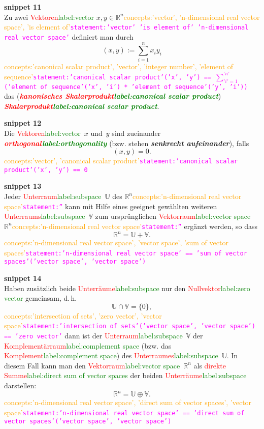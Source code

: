 \documentclass[a4paper,twoside,english,ngerman,deutsch,german,sectrefs,envcountsame,envcountchap]{svmono}
\newcommand{\setref}[2]{\textcolor{red}{#1}\textcolor{green}{#2}}
\newcommand{\snippet}[1]{\textbf{snippet #1}\\}
\newcommand{\eqnote}[2]{\textcolor{orange}{#1}\textcolor{magenta}{\texttt{#2}}}
\begin{document}
\snippet{11}
Zu zwei \setref{Vektoren}{label:vector} $x,y\in{\mathbb{R}}^{n}$\eqnote{concepts:'vector', 'n-dimensional real vector space', 'is element of'}{statement:'vector' 'is element of' 'n-dimensional real vector space'} definiert man durch
\begin{equation}
(x,y):=\sum_{i=1}^{n}x_{i}y_{i}\label{eq:skalarprodukt}
\end{equation}
\eqnote{concepts:'canonical scalar product', 'vector', 'integer number', 'element of sequence'}{statement:'canonical scalar product'('x', 'y') == $\sum_{'i'=1}^{'n'}$ ('element of sequence'('x', 'i') * 'element of sequence'('y', 'i'))}
das (\textbf{\em \setref{kanonisches Skalarprodukt}{label:canonical scalar product}}) \textbf{\em \setref{Skalarprodukt}{label:canonical scalar product}}.

\snippet{12}
Die \setref{Vektoren}{label:vector}~$x$ und~$y$ sind zueinander \textbf{\em \setref{orthogonal}{label:orthogonality}} (bzw. stehen \textbf{\em senkrecht aufeinander}), falls
\[
(x,y)=0.
\]\eqnote{concepts:'vector', 'canonical scalar product'}{statement:'canonical scalar product'('x', 'y') == 0}

\snippet{13}
Jeder \setref{Unterraum}{label:subspace}~$\mathbb{U}$ des ${\mathbb{R}}^{n}$\eqnote{concepts:'n-dimensional real vector space'}{statement:''} kann mit Hilfe eines geeignet gewählten weiteren \setref{Unterraums}{label:subspace}~$\mathbb{V}$ zum ursprünglichen
\setref{Vektorraum}{label:vector space}~${\mathbb{R}}^{n}$\eqnote{concepts:'n-dimensional real vector space'}{statement:''} ergänzt werden, so dass
\[
{\mathbb{R}}^{n}=\mathbb{U}+\mathbb{V}.
\]\eqnote{concepts:'n-dimensional real vector space', 'vector space', 'sum of vector spaces'}{statement:'n-dimensional real vector space' == 'sum of vector spaces'('vector space', 'vector space')}

\snippet{14}
Haben zusätzlich beide \setref{Unterräume}{label:subspace} nur den \setref{Nullvektor}{label:zero vector} gemeinsam, d.\,h.
\[
\mathbb{U}\cap\mathbb{V}=\{0\},
\]\eqnote{concepts:'intersection of sets', 'zero vector', 'vector space'}{statement:'intersection of sets'('vector space', 'vector space') == 'zero vector'}
dann ist der \setref{Unterraum}{label:subspace}~$\mathbb{V}$ der \setref{Komplementärraum}{label:complement space} (bzw. das \setref{Komplement}{label:complement space}) des \setref{Unterraumes}{label:subspace}~$\mathbb{U}$. In diesem Fall kann man den \setref{Vektorraum}{label:vector space}~${\mathbb{R}}^{n}$ als \setref{direkte Summe}{label:direct sum of vector spaces} der beiden \setref{Unterräume}{label:subspace} darstellen:
\[
{\mathbb{R}}^{n}=\mathbb{U}\oplus\mathbb{V}.
\]\eqnote{concepts:'n-dimensional real vector space', 'direct sum of vector spaces', 'vector space'}{statement:'n-dimensional real vector space' == 'direct sum of vector spaces'('vector space', 'vector space')}
\end{document}
